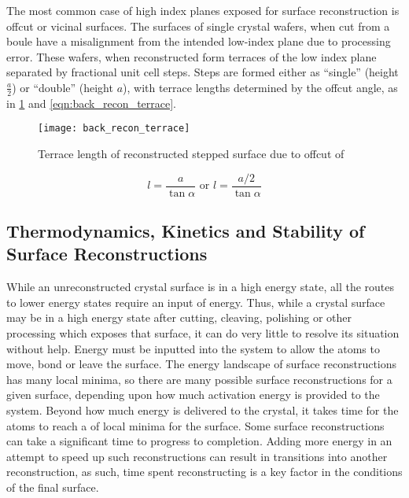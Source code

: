 The most common case of high index planes exposed for surface reconstruction is offcut or vicinal surfaces.
The surfaces of single crystal wafers, when cut from a boule have a misalignment from the intended low-index plane due to processing error.
These wafers, when reconstructed form terraces of the low index plane separated by fractional unit cell steps.
Steps are formed either as ``single'' (height \(\frac{a}{2}\)) or ``double'' (height \(a\)), with terrace lengths determined by the offcut angle, as in \cref{fig:back_recon_terrace} and \cref{eqn:back_recon_terrace}.
\begin{figure}
 \centering \texttt{[image: back\_recon\_terrace]}
 \caption{\label{fig:back_recon_terrace}Terrace length of reconstructed stepped surface due to offcut of \textalpha}
\end{figure}
\begin{equation}
 l = \frac{a}{\tan{\alpha}} \text{ or } l = \frac{a/2}{\tan{\alpha}} \label{eqn:back_recon_terrace}
\end{equation}

\subsection{Thermodynamics, Kinetics and Stability of Surface Reconstructions} While an unreconstructed crystal surface is in a high energy state, all the routes to lower energy states require an input of energy.
Thus, while a crystal surface may be in a high energy state after cutting, cleaving, polishing or other processing which exposes that surface, it can do very little to resolve its situation without help.
Energy must be inputted into the system to allow the atoms to move, bond or leave the surface.
The energy landscape of surface reconstructions has many local minima, so there are many possible surface reconstructions for a given surface, depending upon how much activation energy is provided to the system.
Beyond how much energy is delivered to the crystal, it takes time for the atoms to reach a of local minima for the surface.
Some surface reconstructions can take a significant time to progress to completion.
Adding more energy in an attempt to speed up such reconstructions can result in transitions into another reconstruction, as such, time spent reconstructing is a key factor in the conditions of the final surface.

